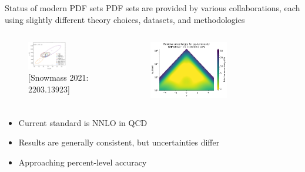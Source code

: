 \documentclass[aspectratio=169, 8pt,t]{beamer}
\begin{document}
\begin{frame}{Status of modern PDF sets}
  PDF sets are provided by various collaborations, each using slightly different theory choices, datasets, and methodologies
  \begin{columns}
    \begin{column}{0.49\textwidth}
      \begin{figure}
        \includegraphics[width=0.6\textwidth]{figures/Httbar_xsec.png}
        \caption*{\color{gray}\small \footnotesize [Snowmass 2021: 2203.13923]}
      \end{figure}
    \end{column}
    \begin{column}{0.49\textwidth}
      \begin{figure}
        \includegraphics[width=0.6\textwidth]{figures/gglumi.pdf}
      \end{figure}
    \end{column}
  \end{columns}
  \begin{columns}
    \begin{column}{0.49\textwidth}
      \begin{itemize}
        \item Current standard is NNLO in QCD
        \item Results are generally consistent, but uncertainties differ
        \item Approaching percent-level accuracy

\end{itemize}
\end{column}
\end{columns}
\end{frame}
\end{document}
